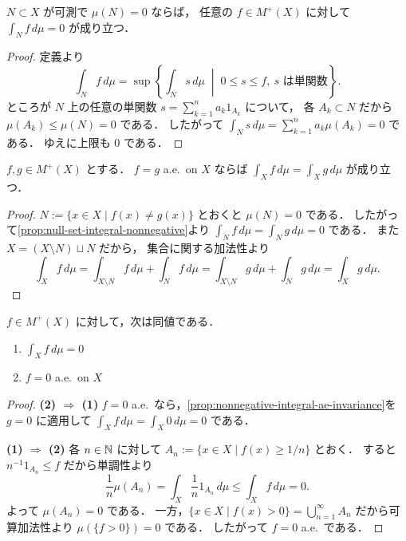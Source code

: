 \begin{proposition}[零集合上の積分]\label{prop:null-set-integral-nonnegative}
$N \subset X$ が可測で $\mu(N)=0$ ならば，
任意の $f\in M^+(X)$ に対して
$\int_N f\,d\mu=0$ が成り立つ．
\end{proposition}
\begin{proof}
定義より
\[
\int_N f\,d\mu
=\sup\left\{\int_N s\,d\mu \;\middle|\; 0 \le s \le f,\ s \text{ は単関数}\right\}.
\]
ところが $N$ 上の任意の単関数 $s=\sum_{k=1}^n a_k1_{A_k}$ について，
各 $A_k \subset N$ だから $\mu(A_k)\le \mu(N)=0$ である．
したがって $\int_N s\,d\mu=\sum_{k=1}^n a_k \mu(A_k)=0$ である．
ゆえに上限も $0$ である．
\end{proof}

\begin{proposition}\label{prop:nonnegative-integral-ae-invariance}
$f,g\in M^+(X)$ とする．
$f=g$ a.e.\ on $X$ ならば
$\int_X f\,d\mu=\int_X g\,d\mu$ が成り立つ．
\end{proposition}
\begin{proof}
$N:=\{x \in X \mid f(x)\ne g(x)\}$ とおくと $\mu(N)=0$ である．
したがって\cref{prop:null-set-integral-nonnegative}より
$\int_N f\,d\mu=\int_N g\,d\mu=0$ である．
また $X=(X\setminus N)\sqcup N$ だから，
集合に関する加法性より
\[
\int_X f\,d\mu
=\int_{X\setminus N} f\,d\mu+\int_N f\,d\mu
=\int_{X\setminus N} g\,d\mu+\int_N g\,d\mu
=\int_X g\,d\mu.
\]
\end{proof}

\begin{proposition}\label{prop:nonnegative-integral-zero-iff-ae-zero}
$f\in M^+(X)$ に対して，次は同値である．
\begin{enumerate}
    \item $\int_X f\,d\mu=0$
    \item $f=0$ a.e.\ on $X$
\end{enumerate}
\end{proposition}
\begin{proof}
\textbf{(2) $\Rightarrow$ (1)}\quad
$f=0$ a.e.\ なら，\cref{prop:nonnegative-integral-ae-invariance}を $g=0$ に適用して
$\int_X f\,d\mu=\int_X 0\,d\mu=0$ である．

\textbf{(1) $\Rightarrow$ (2)}\quad
各 $n \in \mathbb N$ に対して
$A_n:=\{x \in X \mid f(x)\ge 1/n\}$ とおく．
すると
$n^{-1}1_{A_n}\le f$ だから単調性より
\[
\frac1n \mu(A_n)
=\int_X \frac1n 1_{A_n}\,d\mu
\le \int_X f\,d\mu=0.
\]
よって $\mu(A_n)=0$ である．
一方，$\{x \in X \mid f(x)>0\}=\bigcup_{n=1}^{\infty}A_n$ だから可算加法性より $\mu(\{f>0\})=0$ である．
したがって $f=0$ a.e.\ である．
\end{proof}

